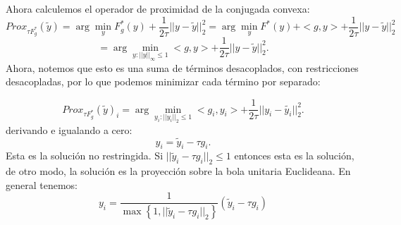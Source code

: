 \documentclass[12pt,draftcls, onecolumn, letterpaper,compsoc]{IEEEtran}
\begin{document}
Ahora calculemos el operador de proximidad de la conjugada convexa:
\begin{displaymath}
    Prox_{\tau F^{*}_{g}}(\tilde{y}) = \arg\min_{y} F^{*}_{g}(y) + \frac{1}{2\tau}||y-\tilde{y}||_{2}^{2} =
    \arg\min_{y} F^{*}(y) + <g, y> + \frac{1}{2\tau}||y-\tilde{y}||_{2}^{2}
\end{displaymath}
\begin{displaymath}
    =\arg\min_{y: ||y||_{\infty}\leq 1} <g,y> + \frac{1}{2\tau}||y-\tilde{y}||_{2}^{2}.
\end{displaymath}
Ahora, notemos que esto es una suma de t\'{e}rminos desacoplados, con restricciones desacopladas, por lo que podemos minimizar cada t\'{e}rmino por separado:

\begin{displaymath}
    Prox_{\tau F^{*}_{g}}(\tilde{y})_{i}=\arg\min_{y_{i}: ||y_{i}||_{2}\leq 1} <g_i,y_i> + \frac{1}{2\tau}||y_i-\tilde{y_i}||_{2}^{2}.
\end{displaymath}
derivando e igualando a cero:
\begin{displaymath}
    y_{i} = \tilde{y}_i - \tau g_i.
\end{displaymath}
Esta es la soluci\'{o}n no restringida. Si $||\tilde{y}_i - \tau g_i||_2 \leq 1$ entonces esta es la soluci\'{o}n, de otro modo, la soluci\'{o}n es la proyecci\'{o}n sobre la bola unitaria Euclideana. En general tenemos:
\begin{displaymath}
    y_{i} = \frac{1}{\max\left\lbrace 1, ||\tilde{y}_i - \tau g_i||_2\right\rbrace}(\tilde{y}_i - \tau g_i)
\end{displaymath}
\end{document}
